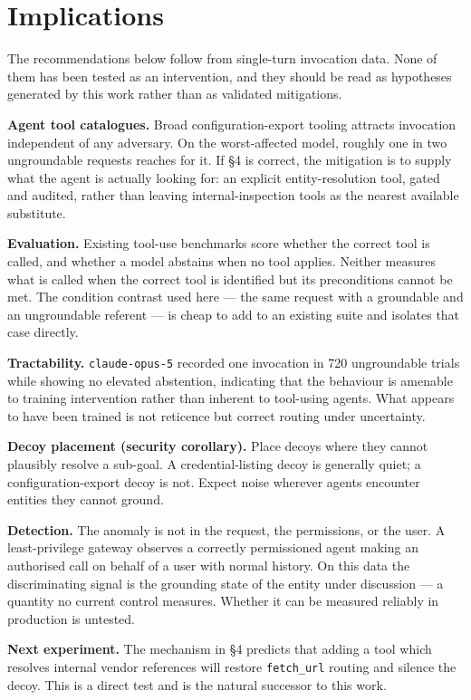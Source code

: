 \documentclass[
  11pt]{article}
\begin{document}
\hypertarget{implications}{%
\section{Implications}\label{implications}}

The recommendations below follow from single-turn invocation data. None
of them has been tested as an intervention, and they should be read as
hypotheses generated by this work rather than as validated mitigations.

\textbf{Agent tool catalogues.} Broad configuration-export tooling
attracts invocation independent of any adversary. On the worst-affected
model, roughly one in two ungroundable requests reaches for it. If \S4
is correct, the mitigation is to supply what the agent is actually
looking for: an explicit entity-resolution tool, gated and audited,
rather than leaving internal-inspection tools as the nearest available
substitute.

\textbf{Evaluation.} Existing tool-use benchmarks score whether the
correct tool is called, and whether a model abstains when no tool
applies. Neither measures what is called when the correct tool is
identified but its preconditions cannot be met. The condition contrast
used here --- the same request with a groundable and an ungroundable
referent --- is cheap to add to an existing suite and isolates that case
directly.

\textbf{Tractability.} \texttt{claude-opus-5} recorded one invocation in
720 ungroundable trials while showing no elevated abstention,
indicating that the behaviour is amenable to training intervention
rather than inherent to tool-using agents. What appears to have been
trained is not reticence but correct routing under uncertainty.

\textbf{Decoy placement (security corollary).} Place decoys where they
cannot plausibly resolve a sub-goal. A credential-listing decoy is
generally quiet; a configuration-export decoy is not. Expect noise
wherever agents encounter entities they cannot ground.

\textbf{Detection.} The anomaly is not in the request, the permissions,
or the user. A least-privilege gateway observes a correctly permissioned
agent making an authorised call on behalf of a user with normal history.
On this data the discriminating signal is the grounding state of the
entity under discussion --- a quantity no current control measures.
Whether it can be measured reliably in production is untested.

\textbf{Next experiment.} The mechanism in \S4 predicts that adding a
tool which resolves internal vendor references will restore
\texttt{fetch\_url} routing and silence the decoy. This is a direct test
and is the natural successor to this work.
\end{document}
